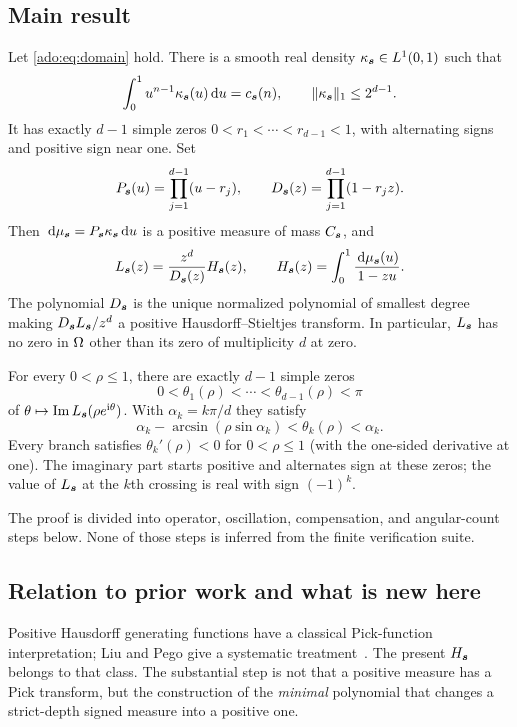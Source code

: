 \subsection{Main result}
\begin{theorem}
\label{ado:thm:main}
Let \eqref{ado:eq:domain} hold. There is a smooth real density
$\kappa_{\boldsymbol{s}}\in L^1(0,1)$ such that
\[
 \int_0^1u^{n-1}\kappa_{\boldsymbol{s}}(u)\,\mathrm d u=c_{\boldsymbol{s}}(n),\qquad
 \lVert\kappa_{\boldsymbol{s}}\rVert_1\le2^{d-1}.
\]
It has exactly $d-1$ simple zeros $0<r_1<\cdots<r_{d-1}<1$, with
alternating signs and positive sign near one. Set
\[
 P_{\boldsymbol{s}}(u)=\prod_{j=1}^{d-1}(u-r_j),\qquad
 D_{\boldsymbol{s}}(z)=\prod_{j=1}^{d-1}(1-r_jz).
\]
Then $\,\mathrm d\mu_{\boldsymbol{s}}=P_{\boldsymbol{s}}\kappa_{\boldsymbol{s}}\,\mathrm d u$ is a positive
measure of mass $C_{\boldsymbol{s}}$, and
\begin{equation}\label{ado:eq:mainfactor}
 L_{\boldsymbol{s}}(z)=\frac{z^d}{D_{\boldsymbol{s}}(z)}H_{\boldsymbol{s}}(z),\qquad
 H_{\boldsymbol{s}}(z)=\int_0^1\frac{\,\mathrm d\mu_{\boldsymbol{s}}(u)}{1-zu}.
\end{equation}
The polynomial $D_{\boldsymbol{s}}$ is the unique normalized polynomial of
smallest degree making $D_{\boldsymbol{s}}L_{\boldsymbol{s}}/z^d$ a positive
Hausdorff--Stieltjes transform. In particular, $L_{\boldsymbol{s}}$ has no zero
in $\Omega$ other than its zero of multiplicity $d$ at zero.

For every $0<\rho\le1$, there are exactly $d-1$ simple zeros
\[
 0<\theta_1(\rho)<\cdots<\theta_{d-1}(\rho)<\pi
\]
of $\theta\mapsto\operatorname{Im} L_{\boldsymbol{s}}(\rho e^{\mathrm i\theta})$.
With $\alpha_k=k\pi/d$ they satisfy
\begin{equation}\label{ado:eq:mainangles}
 \alpha_k-\arcsin(\rho\sin\alpha_k)
 <\theta_k(\rho)<\alpha_k.
\end{equation}
Every branch satisfies $\theta_k'(\rho)<0$ for $0<\rho\le1$ (with the
one-sided derivative at one). The imaginary part starts positive and
alternates sign at these zeros;
the value of $L_{\boldsymbol{s}}$ at the $k$th crossing is real with sign $(-1)^k$.
\end{theorem}
The proof is divided into operator, oscillation, compensation, and
angular-count steps below. None of those steps is inferred from the
finite verification suite.

\subsection{Relation to prior work and what is new here}
Positive Hausdorff generating functions have a classical Pick-function
interpretation; Liu and Pego give a systematic treatment~\cite{LiuPego}.
The present $H_{\boldsymbol{s}}$ belongs to that class. The substantial step is
not that a positive measure has a Pick transform, but the construction
of the \emph{minimal} polynomial that changes a strict-depth signed
measure into a positive one.

